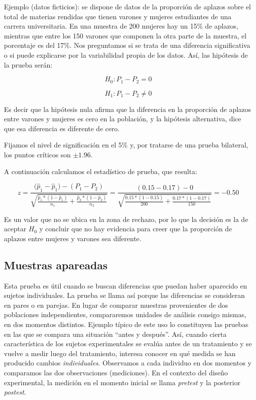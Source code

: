 \documentclass[]{book}
\begin{document}
Ejemplo (datos ficticios): se dispone de datos de la proporción de
aplazos sobre el total de materias rendidas que tienen varones y mujeres
estudiantes de una carrera universitaria. En una muestra de 200 mujeres
hay un 15\% de aplazos, mientras que entre los 150 varones que componen
la otra parte de la muestra, el porcentaje es del 17\%. Nos preguntamos
si se trata de una diferencia significativa o si puede explicarse por la
variabilidad propia de los datos. Así, las hipótesis de la prueba serán:

\[H_{0}:P_{1} - P_{2} = 0\]

\[H_{1}:P_{1} - P_{2} \neq 0\]

Es decir que la hipótesis nula afirma que la diferencia en la proporción
de aplazos entre varones y mujeres es cero en la población, y la
hipótesis alternativa, dice que esa diferencia es diferente de cero.

Fijamos el nivel de significación en el 5\% y, por tratarse de una prueba
bilateral, los puntos críticos son \(\pm 1.96\).

A continuación calculamos el estadístico de prueba, que resulta:

\[z = \frac{{(\widehat{p}}_{1} - {\widehat{p}}_{1}) - (P_{1} - P_{2})}{\sqrt{\frac{{\widehat{p}}_{1}*(1 - {\widehat{p}}_{1})}{n_{1}} + \frac{{\widehat{p}}_{2}*(1 - {\widehat{p}}_{2})}{n_{2}}}} = \frac{\left( 0.15 - 0.17 \right) - 0}{\sqrt{\frac{0.15*(1 - 0.15)}{200} + \frac{0.17*(1 - 0.17)}{150}}} = - 0.50\]

Es un valor que no se ubica en la zona de rechazo, por lo que la
decisión es la de aceptar \(H_0\) y concluir que no hay evidencia para
creer que la proporción de aplazos entre mujeres y varones sea
diferente.

\hypertarget{muestras-apareadas}{%
\subsection{Muestras apareadas}\label{muestras-apareadas}}

Esta prueba es útil cuando se buscan diferencias que puedan haber
aparecido en sujetos individuales. La prueba se llama así porque las
diferencias se consideran en pares o en parejas. En lugar de comparar
muestras provenientes de dos poblaciones independientes, compararemos
unidades de análisis consigo mismas, en dos momentos distintos. Ejemplo
típico de este uso lo constituyen las pruebas en las que se compara una
situación ``antes y después''. Así, cuando cierta característica de los
sujetos experimentales se evalúa antes de un tratamiento y se vuelve a
medir luego del tratamiento, interesa conocer en qué medida se han
producido cambios \emph{individuales}. Observamos a cada individuo en dos
momentos y comparamos las dos observaciones (mediciones). En el contexto
del diseño experimental, la medición en el momento inicial se llama
\emph{pretest} y la posterior \emph{postest}.
\end{document}
